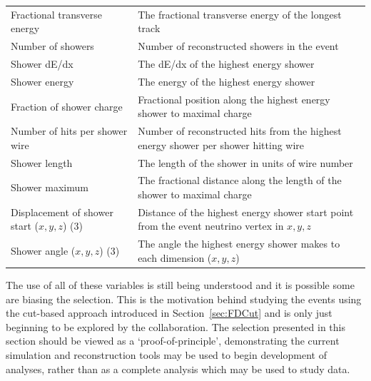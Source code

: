 \begin{table}
\begin{tabular}{ p{5cm} p{9cm} }
    \rowcolor{gray!30} Fractional transverse energy                           & The fractional transverse energy of the longest track \\
                       Number of showers                                      & Number of reconstructed showers in the event \\
    \rowcolor{gray!30} Shower dE/dx                                           & The dE/dx of the highest energy shower \\
                       Shower energy                                          & The energy of the highest energy shower \\
    \rowcolor{gray!30} Fraction of shower charge                              & Fractional position along the highest energy shower to maximal charge \\
                       Number of hits per shower wire                         & Number of reconstructed hits from the highest energy shower per shower hitting wire \\
    \rowcolor{gray!30} Shower length                                          & The length of the shower in units of wire number \\
                       Shower maximum                                         & The fractional distance along the length of the shower to maximal charge \\
    \rowcolor{gray!30} Displacement of shower start ($x,y,z$) (3)             & Distance of the highest energy shower start point from the event neutrino vertex in $x,y,z$ \\
                       Shower angle ($x,y,z$) (3)                             & The angle the highest energy shower makes to each dimension ($x,y,z$) \\
    \bottomrule
  \end{tabular}
\end{table}

The use of all of these variables is still being understood and it is possible some are biasing the selection.  This is the motivation behind studying the events using the cut-based approach introduced in Section~\ref{sec:FDCut} and is only just beginning to be explored by the collaboration.  The selection presented in this section should be viewed as a `proof-of-principle', demonstrating the current simulation and reconstruction tools may be used to begin development of analyses, rather than as a complete analysis which may be used to study data.

